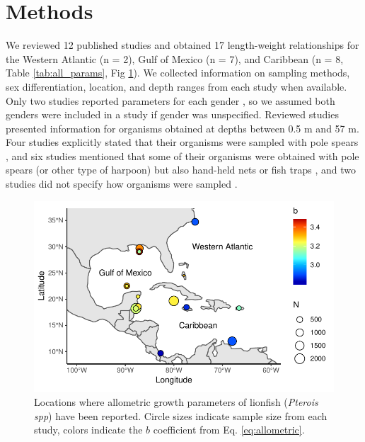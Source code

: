 \documentclass[fleqn,10pt,lineno]{wlpeerj} %
\begin{document}
\clearpage

\section*{Methods}

We reviewed 12 published studies and obtained 17 length-weight
relationships for the Western Atlantic (n = 2), Gulf of Mexico (n = 7),
and Caribbean (n = 8, Table \ref{tab:all_params}, Fig \ref{fig:map}). We
collected information on sampling methods, sex differentiation,
location, and depth ranges from each study when available. Only two
studies reported parameters for each gender
\citep{aguilarperera_2016,fogg_2013}, so we assumed both genders were
included in a study if gender was unspecified. Reviewed studies
presented information for organisms obtained at depths between 0.5 m and
57 m. Four studies explicitly stated that their organisms were sampled
with pole spears
\citep{dahl_2014,aguilarperera_2016,chin_2016,sabidoitz_2016}, and six
studies mentioned that some of their organisms were obtained with pole
spears (or other type of harpoon) but also hand-held nets or fish traps
\citep{barbour_2011,fogg_2013,edwards_2014,toledohernndez_2014,sandel_2015,sabidoitza_2016},
and two studies did not specify how organisms were sampled
\citep{darling_2011,deleon_2013}.

\begin{figure}
\centering
\includegraphics{Manuscript_files/figure-latex/map-1.pdf}
\caption{\label{fig:map}Locations where allometric growth parameters of
lionfish (\emph{Pterois spp}) have been reported. Circle sizes indicate
sample size from each study, colors indicate the \(b\) coefficient from
Eq. \ref{eq:allometric}.}
\end{figure}
\end{document}
